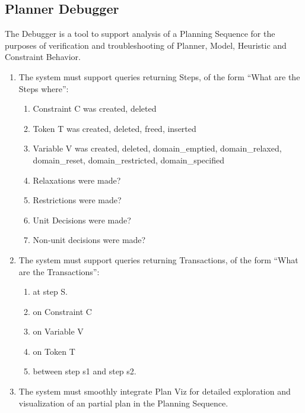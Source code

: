 \documentclass[twoside, 11pt]{article}
\begin{document}
\subsection{Planner Debugger}
The Debugger is a tool to support analysis of a Planning Sequence for the purposes of verification and troubleshooting of Planner, Model, Heuristic and Constraint Behavior.
\begin{enumerate}
\item The system must support queries returning Steps, of the form ``What are the Steps where'':
\begin{enumerate}
\item Constraint C was created, deleted
\item Token T was created, deleted, freed, inserted
\item Variable V was created, deleted, domain_emptied, domain_relaxed, domain_reset, domain_restricted, domain_specified
\item Relaxations were made?
\item Restrictions were made?
\item Unit Decisions were made?
\item Non-unit decisions were made?
\end{enumerate}
\item The system must support queries returning Transactions, of the form ``What are the Transactions'':
\begin{enumerate}
\item at step S.
\item on Constraint C
\item on Variable V
\item on Token T
\item between step s1 and step s2.
\end{enumerate}
\item The system must smoothly integrate Plan Viz for detailed exploration and visualization of an partial plan in the Planning Sequence.
\end{enumerate}
\end{document}
